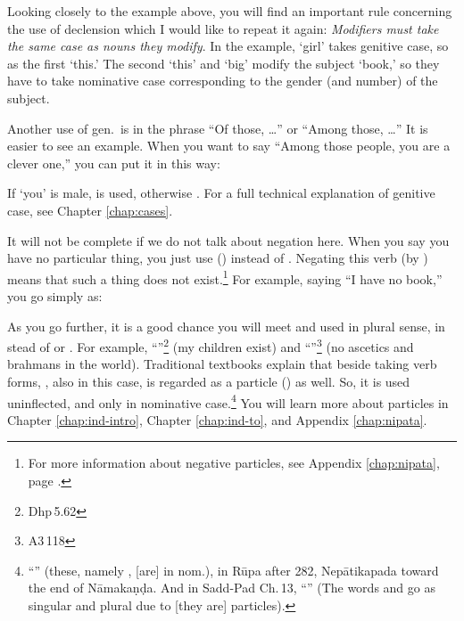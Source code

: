 Looking closely to the example above, you will find an important rule concerning the use of declension which I would like to repeat it again: \emph{Modifiers must take the same case as nouns they modify}. In the example, `girl' takes genitive case, so as the first `this.' The second `this' and `big' modify the subject `book,' so they have to take nominative case corresponding to the gender (and number) of the subject.

Another use of gen.\ is in the phrase ``Of those, \ldots'' or ``Among those, \ldots'' It is easier to see an example. When you want to say ``Among those people, you are a clever one,'' you can put it in this way:


If `you' is male,  is used, otherwise . For a full technical explanation of genitive case, see Chapter \ref{chap:cases}.

It will not be complete if we do not talk about negation here. When you say you have no particular thing, you just use  () instead of . Negating this verb (by ) means that such a thing does not exist.\footnote{For more information about negative particles, see Appendix \ref{chap:nipata}, page \pageref{nip:neg}.} For example, saying ``I have no book,'' you go simply as:


As you go further, it is a good chance you will meet  and  used in plural sense, in stead of  or . For example, ``''\footnote{Dhp\,5.62} (my children exist) and ``''\footnote{A3\,118} (no ascetics and brahmans in the world). Traditional textbooks explain that beside taking verb forms, , also  in this case, is regarded as a particle () as well. So, it is used uninflected, and only in nominative case.\footnote{``'' (these, namely , [are] in nom.), in R\=upa after 282, Nep\=atikapada toward the end of N\=amaka\d n\d da. And in Sadd-Pad Ch.\,13, ``'' (The words  and  go as singular and plural due to [they are] particles).} You will learn more about particles in Chapter \ref{chap:ind-intro}, Chapter \ref{chap:ind-to}, and Appendix \ref{chap:nipata}.

